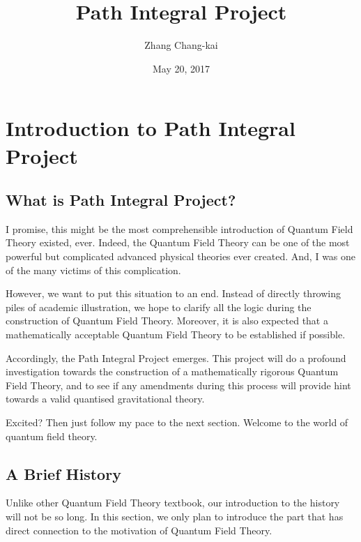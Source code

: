 \documentclass[letterpaper,10pt,english]{sphinxmanual}
\title{Path Integral Project}
\date{May 20, 2017}
\author{Zhang Chang-kai}
\begin{document}
\maketitle
\sphinxtableofcontents
{}\label{\detokenize{index::doc}}



\chapter{Introduction to Path Integral Project}
\label{\detokenize{intro:introduction-to-path-integral-project}}\label{\detokenize{intro:path-integral-project}}\label{\detokenize{intro::doc}}

\section{What is Path Integral Project?}
\label{\detokenize{intro_what:what-is-path-integral-project}}\label{\detokenize{intro_what::doc}}
I promise, this might be the most comprehensible introduction of Quantum Field Theory existed, ever. Indeed, the Quantum Field Theory can be one of the most powerful but complicated advanced physical theories ever created. And, I was one of the many victims of this complication.

However, we want to put this situation to an end. Instead of directly throwing piles of academic illustration, we hope to clarify all the logic during the construction of Quantum Field Theory. Moreover, it is also expected that a mathematically acceptable Quantum Field Theory to be established if possible.

Accordingly, the Path Integral Project emerges. This project will do a profound investigation towards the construction of a mathematically rigorous Quantum Field Theory, and to see if any amendments during this process will provide hint towards a valid quantised gravitational theory.

Excited? Then just follow my pace to the next section. Welcome to the world of quantum field theory.


\section{A Brief History}
\label{\detokenize{intro_history:a-brief-history}}\label{\detokenize{intro_history::doc}}
Unlike other Quantum Field Theory textbook, our introduction to the history will not be so long. In this section, we only plan to introduce the part that has direct connection to the motivation of Quantum Field Theory.
\end{document}
